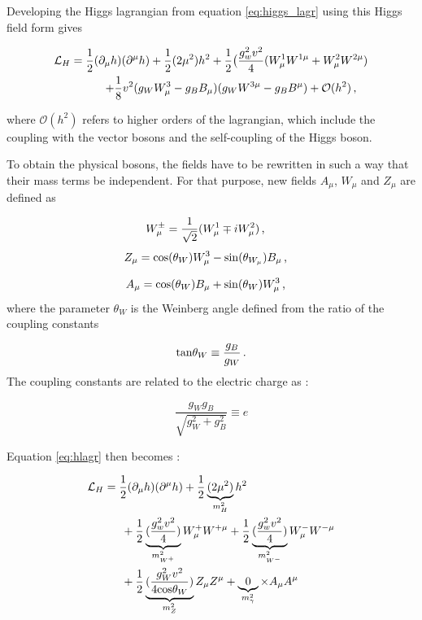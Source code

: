 Developing the Higgs lagrangian from equation \ref{eq:higgs_lagr} using this Higgs field form gives

\begin{align}
    \Lagr_H = \frac{1}{2}(\partial_{\mu}h)(\partial^{\mu}h) + \frac{1}{2}(2\mu^2 )h^2 + \frac{1}{2} \big( \frac{g^{2}_w v^2}{4} (W_{\mu}^1 W^{1\mu} + W_{\mu}^2 W^{2\mu}) \\ + \frac{1}{8} v^2 (g_W W_{\mu}^3 - g_B B_{\mu})(g_W W^{3\mu} - g_B B^{\mu}) + \mathcal{O}(h^2) \msep
    \label{eq:hlagr}
\end{align}

where $\mathcal{O}(h^2)$ refers to higher orders of the lagrangian, which include the coupling with the vector bosons and the self-coupling of the Higgs boson.

To obtain the physical bosons, the fields have to be rewritten in such a way that their mass terms be independent. For that purpose, new fields $A_{\mu}$, $W_{\mu}$ and $Z_{\mu}$ are defined as

\begin{equation}
    W^{\pm}_\mu = \frac{1}{\sqrt{2}}(W_{\mu}^1 \mp iW_{\mu}^2) \msep
\end{equation}
\begin{equation}
    Z_{\mu} = \mathrm{cos}(\theta_{W})W^3_{\mu} - \mathrm{sin}(\theta_{W_{\mu}})B_{\mu} \msep
\end{equation}

\begin{equation}
    A_{\mu} = \mathrm{cos}(\theta_{W})B_{\mu} + \mathrm{sin}(\theta_{W})W_{\mu}^3 \msep
\end{equation}
where the parameter $\theta_W$ is the Weinberg angle \cite{GLASHOW1961579} defined from the ratio of the coupling constants

\begin{equation}
    \mathrm{tan} \theta_W \equiv \frac{g_B}{g_W} \mend
\end{equation}
The coupling constants are related to the electric charge as :

\begin{equation}
    \frac{g_W g_B}{\sqrt{g_{W}^2 + g^{2}_B}} \equiv e
\end{equation}

Equation \ref{eq:hlagr} then becomes :

\begin{align}
    \MoveEqLeft[3]
    \Lagr_H = \frac{1}{2}(\partial_{\mu}h)(\partial^{\mu}h) + \frac{1}{2}\underbrace{(2\mu^2 )}_{m_{H}^2}h^2 \\ {}& + \frac{1}{2} \underbrace{(\frac{g_{w}^2 v^2}{4})}_{m_{W^+}^2} W_{\mu}^+ W^{+\mu} + \frac{1}{2} \underbrace{(\frac{g_{w}^2 v^2}{4})}_{m_{W^-}^2} W_{\mu}^- W^{-\mu} \\ {}& + \frac{1}{2} \underbrace{(\frac{g_W^2 v^2}{4\mathrm{cos}\theta_W})}_{m_Z^2} Z_{\mu} Z^{\mu} + \underbrace{0}_{m_{\gamma}^2}\times A_{\mu}A^{\mu}
\end{align} 

